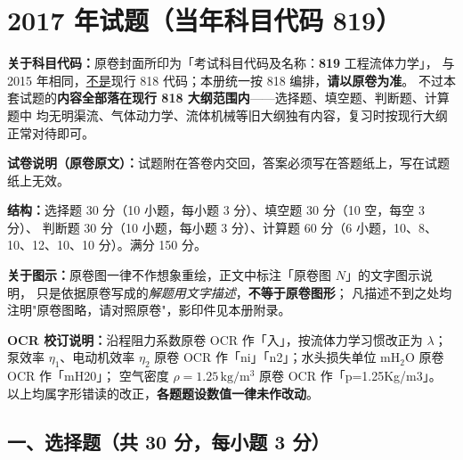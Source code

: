 \chapter{2017 年试题（当年科目代码 819）}

\begin{tishi}
\textbf{关于科目代码：}原卷封面所印为「考试科目代码及名称：\textbf{819} 工程流体力学」，
与 2015 年相同，\underline{不是}现行 818 代码；本册统一按 818 编排，\textbf{请以原卷为准}。
不过本套试题的\textbf{内容全部落在现行 818 大纲范围内}——选择题、填空题、判断题、计算题中
均无明渠流、气体动力学、流体机械等旧大纲独有内容，复习时按现行大纲正常对待即可。

\textbf{试卷说明（原卷原文）：}试题附在答卷内交回，答案必须写在答题纸上，写在试题纸上无效。

\textbf{结构：}选择题 30 分（10 小题，每小题 3 分）、填空题 30 分（10 空，每空 3 分）、
判断题 30 分（10 小题，每小题 3 分）、计算题 60 分（6 小题，10、8、10、12、10、10 分）。满分 150 分。

\textbf{关于图示：}原卷图一律不作想象重绘，正文中标注「原卷图 $N$」的文字图示说明，
只是依据原卷写成的\emph{解题用文字描述}，\textbf{不等于原卷图形}；
凡描述不到之处均注明"原卷图略，请对照原卷"，影印件见本册附录。

\textbf{OCR 校订说明：}沿程阻力系数原卷 OCR 作「入」，按流体力学习惯改正为 $\lambda$；
泵效率 $\eta_1$、电动机效率 $\eta_2$ 原卷 OCR 作「ni」「n2」；水头损失单位 mH$_2$O 原卷 OCR 作「mH20」；
空气密度 $\rho=1.25\,\mathrm{kg/m^3}$ 原卷 OCR 作「p=1.25Kg/m3」。
以上均属字形错读的改正，\textbf{各题题设数值一律未作改动}。
\end{tishi}

\section{一、选择题（共 30 分，每小题 3 分）}

